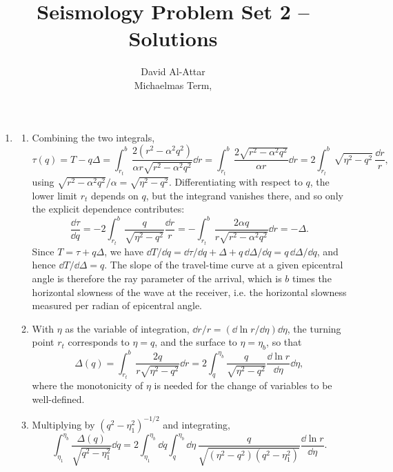 \documentclass[a4paper,10pt]{paper}
\title{Seismology Problem Set 2 -- Solutions}
\author{David Al-Attar \\ Michaelmas Term, \the\year}
\begin{document}
\maketitle

\begin{enumerate}
\item
\begin{enumerate}
\item Combining the two integrals,
\begin{equation*}
    \tau(q)=T-q\Delta=\int_{r_{t}}^{b}\frac{2(r^{2}-\alpha^{2}q^{2})}{\alpha r\sqrt{r^{2}-\alpha^{2}q^{2}}}\dd r
    =\int_{r_{t}}^{b}\frac{2\sqrt{r^{2}-\alpha^{2}q^{2}}}{\alpha r}\dd r=2\int_{r_{t}}^{b}\sqrt{\eta^{2}-q^{2}}\,\frac{\dd r}{r},
\end{equation*}
using $\sqrt{r^{2}-\alpha^{2}q^{2}}/\alpha=\sqrt{\eta^{2}-q^{2}}$. Differentiating with respect to $q$, the lower limit $r_{t}$ depends on $q$, 
but the integrand vanishes there, and so only the explicit dependence contributes:
\begin{equation*}
    \frac{\dd\tau}{\dd q}=-2\int_{r_{t}}^{b}\frac{q}{\sqrt{\eta^{2}-q^{2}}}\frac{\dd r}{r}=-\int_{r_{t}}^{b}\frac{2\alpha q}{r\sqrt{r^{2}-\alpha^{2}q^{2}}}\dd r=-\Delta.
\end{equation*}
Since $T=\tau+q\Delta$, we have $\dd T/\dd q=\dd\tau/\dd q+\Delta+q\,\dd\Delta/\dd q=q\,\dd\Delta/\dd q$, and hence $\dd T/\dd\Delta=q$. The slope 
of the travel-time curve at a given epicentral angle is therefore the ray parameter of the arrival, which is $b$ times the 
horizontal slowness of the wave at the receiver, i.e. the horizontal slowness measured per radian of epicentral angle.
\item With $\eta$ as the variable of integration, $\dd r/r=(\dd\ln r/\dd\eta)\dd\eta$, the turning point $r_{t}$ corresponds to $\eta=q$, and 
the surface to $\eta=\eta_{b}$, so that
\begin{equation*}
    \Delta(q)=\int_{r_{t}}^{b}\frac{2q}{r\sqrt{\eta^{2}-q^{2}}}\dd r=2\int_{q}^{\eta_{b}}\frac{q}{\sqrt{\eta^{2}-q^{2}}}\frac{\dd\ln r}{\dd\eta}\dd\eta,
\end{equation*}
where the monotonicity of $\eta$ is needed for the change of variables to be well-defined.
\item Multiplying by $(q^{2}-\eta_{1}^{2})^{-1/2}$ and integrating,
\begin{equation*}
    \int_{\eta_{1}}^{\eta_{b}}\frac{\Delta(q)}{\sqrt{q^{2}-\eta_{1}^{2}}}\dd q=2\int_{\eta_{1}}^{\eta_{b}}\dd q\int_{q}^{\eta_{b}}\dd\eta\,
    \frac{q}{\sqrt{(\eta^{2}-q^{2})(q^{2}-\eta_{1}^{2})}}\frac{\dd\ln r}{\dd\eta}.

\end{equation*}
\end{enumerate}
\end{enumerate}
\end{document}
